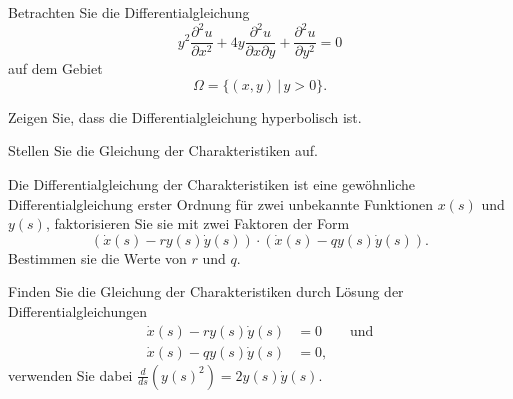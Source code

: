 Betrachten Sie die Differentialgleichung
\[
y^2\frac{\partial^2 u}{\partial x^2}
+4y\frac{\partial^2u}{\partial x\partial y}
+\frac{\partial^2 u}{\partial y^2}=0
\]
auf dem Gebiet
\[
\Omega = \{ (x,y)\,|\, y >0\}.
\]
\begin{teilaufgaben}
\item Zeigen Sie, dass die Differentialgleichung hyperbolisch ist.
\item Stellen Sie die Gleichung der Charakteristiken auf.
\item Die Differentialgleichung der Charakteristiken ist eine
gewöhnliche Differentialgleichung erster Ordnung für zwei unbekannte
Funktionen $x(s)$ und $y(s)$, faktorisieren Sie sie mit zwei Faktoren
der Form
\[
(\dot x(s)-ry(s)\dot y(s))\cdot (\dot x(s)-qy(s)\dot y(s)).
\]
Bestimmen
sie die Werte von $r$ und $q$.
\item
Finden Sie die Gleichung der Charakteristiken durch
Lösung der Differentialgleichungen
\begin{align*}
\dot x(s) - ry(s)\dot y(s)&=0\qquad\text{und}\\
\dot x(s) - qy(s)\dot y(s)&=0,
\end{align*}
verwenden Sie dabei
$\frac{d}{ds}(y(s)^2)=2y(s)\dot y(s)$.
\end{teilaufgaben}

